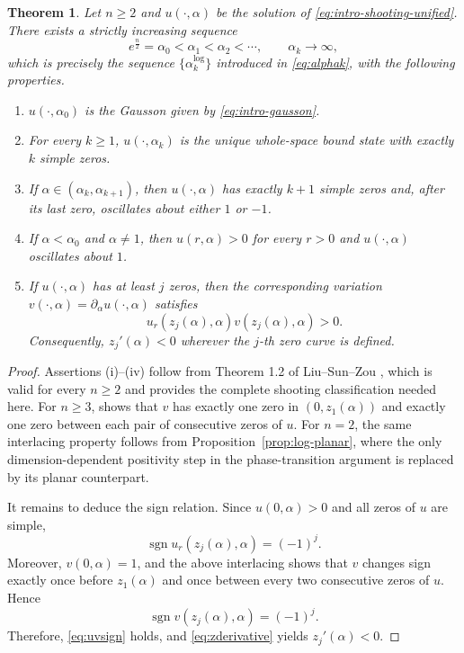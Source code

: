 \documentclass[11pt]{article}
\newtheorem{theorem}{Theorem}[section]
\begin{document}
\begin{theorem}\label{thm:log-whole}
Let $n\geq2$ and $u(\cdot,\alpha)$ be the solution of \eqref{eq:intro-shooting-unified}.  There exists a strictly increasing sequence
\[
 e^{\frac{n}{2}}=\alpha_0<\alpha_1<\alpha_2<\cdots,
 \qquad \alpha_k\to\infty,
\]
which is precisely the sequence $\{\alpha_k^{\log}\}$ introduced in
\eqref{eq:alphak}, with the following properties.
\begin{enumerate}[label=\rm(\roman*)]
\item $u(\cdot,\alpha_0)$ is the Gausson given by \eqref{eq:intro-gausson}.
\item For every $k\geq1$, $u(\cdot,\alpha_k)$ is the unique whole-space bound state
with exactly $k$ simple zeros.
\item If $\alpha\in(\alpha_k,\alpha_{k+1})$, then $u(\cdot,\alpha)$ has exactly $k+1$ simple zeros and,
after its last zero, oscillates about either $1$ or $-1$.
\item If $\alpha<\alpha_0$ and $\alpha\ne1$, then $u(r,\alpha)>0$ for every $r>0$ and $u(\cdot,\alpha)$ oscillates about $1$.
\item If $u(\cdot,\alpha)$ has at least $j$ zeros, then the corresponding variation $v(\cdot,\alpha)=\partial_\alpha u(\cdot,\alpha)$ satisfies
\begin{equation}\label{eq:uvsign}
 u_r(z_j(\alpha),\alpha)v(z_j(\alpha),\alpha)>0.
\end{equation}
Consequently, $z_j'(\alpha)<0$ wherever the $j$-th zero curve is defined.
\end{enumerate}
\end{theorem}

\begin{proof}
Assertions (i)--(iv) follow from Theorem 1.2 of Liu--Sun--Zou
\cite{LiuSunZou}, which is valid for every $n\geq2$ {and provides the
complete shooting classification needed here}.  For $n\geq3$,  \cite[Proposition 3.5]{LiuSunZou} shows that $v$ has exactly one zero in $(0,z_1(\alpha))$ and exactly one zero between each pair of consecutive zeros of $u$.
For $n=2$, the same interlacing property follows from Proposition~\ref{prop:log-planar}, where the only dimension-dependent positivity step in the phase-transition argument is replaced by its planar counterpart.

It remains to deduce the sign relation. Since $u(0,\alpha)>0$ and all zeros of $u$ are simple,
\[
 \operatorname{sgn}u_r(z_j(\alpha),\alpha)=(-1)^j.
\]
Moreover, $v(0,\alpha)=1$, and the above interlacing shows that $v$ changes sign exactly once before $z_1(\alpha)$ and once between every two consecutive zeros of $u$. Hence
\[
 \operatorname{sgn}v(z_j(\alpha),\alpha)=(-1)^j.
\]
Therefore, \eqref{eq:uvsign} holds, and \eqref{eq:zderivative} yields $z_j'(\alpha)<0$.
\end{proof}
\end{document}
